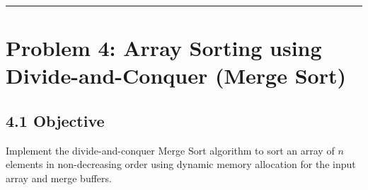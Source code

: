\documentclass[12pt]{article}
\begin{document}
\vspace{10pt}
\hrule
\vspace{10pt}

\section*{Problem 4: Array Sorting using Divide-and-Conquer (Merge Sort)}

\subsection*{4.1 Objective}
Implement the divide-and-conquer Merge Sort algorithm to sort an array of $n$ elements in non-decreasing order using dynamic memory allocation for the input array and merge buffers.
\end{document}
